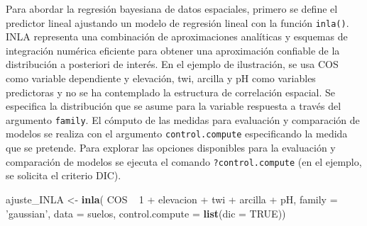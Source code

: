 \documentclass[11pt,b5paper,]{krantz}
\newenvironment{Shaded}{}{}
\newcommand{\KeywordTok}[1]{\textcolor[rgb]{0.00,0.44,0.13}{\textbf{#1}}}
\newcommand{\DataTypeTok}[1]{\textcolor[rgb]{0.56,0.13,0.00}{#1}}
\newcommand{\DecValTok}[1]{\textcolor[rgb]{0.25,0.63,0.44}{#1}}
\newcommand{\StringTok}[1]{\textcolor[rgb]{0.25,0.44,0.63}{#1}}
\newcommand{\OtherTok}[1]{\textcolor[rgb]{0.00,0.44,0.13}{#1}}
\newcommand{\OperatorTok}[1]{\textcolor[rgb]{0.40,0.40,0.40}{#1}}
\newcommand{\NormalTok}[1]{#1}
\begin{document}
Para abordar la regresión bayesiana de datos espaciales, primero se
define el predictor lineal ajustando un modelo de regresión lineal con
la función \texttt{inla()}. INLA representa una combinación de
aproximaciones analíticas y esquemas de integración numérica eficiente
para obtener una aproximación confiable de la distribución a posteriori
de interés. En el ejemplo de ilustración, se usa COS como variable
dependiente y elevación, twi, arcilla y pH como variables predictoras y
no se ha contemplado la estructura de correlación espacial. Se
especifica la distribución que se asume para la variable respuesta a
través del argumento \texttt{family}. El cómputo de las medidas para
evaluación y comparación de modelos se realiza con el argumento
\texttt{control.compute} especificando la medida que se pretende. Para
explorar las opciones disponibles para la evaluación y comparación de
modelos se ejecuta el comando \texttt{?control.compute} (en el ejemplo,
se solicita el criterio DIC).

\begin{Shaded}
\begin{Highlighting}[]
\NormalTok{ajuste_INLA <-}\StringTok{ }\KeywordTok{inla}\NormalTok{(}
\NormalTok{  COS }\OperatorTok{~}\StringTok{ }\DecValTok{1} \OperatorTok{+}\StringTok{ }\NormalTok{elevacion }\OperatorTok{+}\StringTok{ }\NormalTok{twi }\OperatorTok{+}\StringTok{ }\NormalTok{arcilla }\OperatorTok{+}\StringTok{ }\NormalTok{pH,}
  \DataTypeTok{family =} \StringTok{'gaussian'}\NormalTok{,}
  \DataTypeTok{data =}\NormalTok{ suelos,}
  \DataTypeTok{control.compute =} \KeywordTok{list}\NormalTok{(}\DataTypeTok{dic =} \OtherTok{TRUE}\NormalTok{))}
\end{Highlighting}
\end{Shaded}
\end{document}

